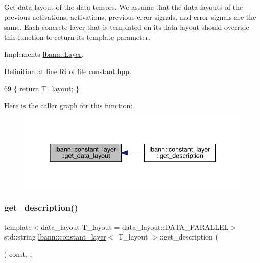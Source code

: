 Get data layout of the data tensors. We assume that the data layouts of the previous activations, activations, previous error signals, and error signals are the same. Each concrete layer that is templated on its data layout should override this function to return its template parameter. 

Implements \hyperlink{classlbann_1_1Layer_a5dfb66e81fc085997402a5e2241316bd}{lbann\+::\+Layer}.



Definition at line 69 of file constant.\+hpp.


\begin{DoxyCode}
69 \{ \textcolor{keywordflow}{return} T\_layout; \}
\end{DoxyCode}
Here is the caller graph for this function\+:\nopagebreak
\begin{figure}[H]
\begin{center}
\leavevmode
\includegraphics[width=338pt]{classlbann_1_1constant__layer_ac69dbc39164ddb6cee7f61434bdb317d_icgraph}
\end{center}
\end{figure}
\mbox{\label{classlbann_1_1constant__layer_a2745baa79137db746795634144b99080}} 
\subsubsection{\texorpdfstring{get\+\_\+description()}{get\_description()}}
{\footnotesize\ttfamily template$<$data\+\_\+layout T\+\_\+layout = data\+\_\+layout\+::\+D\+A\+T\+A\+\_\+\+P\+A\+R\+A\+L\+L\+EL$>$ \\
std\+::string \hyperlink{classlbann_1_1constant__layer}{lbann\+::constant\+\_\+layer}$<$ T\+\_\+layout $>$\+::get\+\_\+description (\begin{DoxyParamCaption}{ }\end{DoxyParamCaption}) const\hspace{0.3cm}{\ttfamily [inline]}, {\ttfamily [override]}, {\ttfamily [virtual]}}

